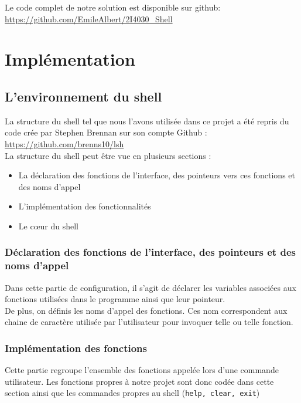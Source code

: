 \documentclass[10pt,a4paper]{article}
\begin{document}
Le code complet de notre solution est disponible sur github:
\url{https://github.com/EmileAlbert/2I4030_Shell}
\section{Implémentation}
\subsection{L'environnement du shell}
La structure du shell tel que nous l'avons utilisée dans ce projet a été repris du code crée par Stephen Brennan sur son compte Github : \url{https://github.com/brenns10/lsh}\\

La structure du shell peut être vue en plusieurs sections :
\begin{itemize}
\item La déclaration des fonctions de l'interface, des pointeurs vers ces fonctions et des noms d'appel
\item L'implémentation des fonctionnalités
\item Le c\oe{}ur du shell 
\end{itemize}

\subsubsection{Déclaration des fonctions de l'interface, des pointeurs et des noms d'appel}
Dans cette partie de configuration, il s'agit de déclarer les variables associées aux fonctions utilisées dans le programme ainsi que leur pointeur.\\

De plus, on définis les noms d'appel des fonctions. Ces nom correspondent aux chaine de caractère utilisée par l'utilisateur pour invoquer telle ou telle fonction.

\subsubsection{Implémentation des fonctions}
Cette partie regroupe l'ensemble des fonctions appelée lors d'une commande utilisateur. Les fonctions propres à notre projet sont donc codée dans cette section ainsi que les commandes propres au shell (\texttt{help, clear, exit})
\end{document}
